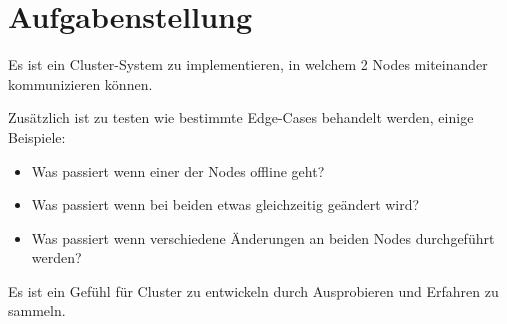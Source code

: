

\section{Aufgabenstellung}
Es ist ein Cluster-System zu implementieren, in welchem 2 Nodes miteinander kommunizieren können.

Zusätzlich ist zu testen wie bestimmte Edge-Cases behandelt werden, einige Beispiele:

\begin{itemize}
	\item Was passiert wenn einer der Nodes offline geht?
	\item Was passiert wenn bei beiden etwas gleichzeitig geändert wird?
	\item Was passiert wenn verschiedene Änderungen an beiden Nodes durchgeführt werden?
\end{itemize}

Es ist ein Gefühl für Cluster zu entwickeln durch Ausprobieren und Erfahren zu sammeln.
